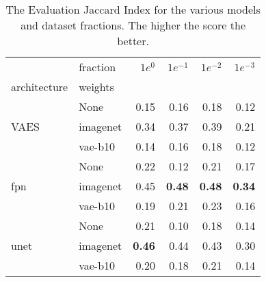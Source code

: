 \begin{table}[ht]
\centering
\caption{The Evaluation Jaccard Index for the various models and dataset fractions. The higher the score the better.}
\label{tab:data_fraction_results}
\begin{tabular}{llrrrr}
\toprule
 & fraction & $1e^{0}$ & $1e^{-1}$ & $1e^{-2}$ & $1e^{-3}$ \\
architecture & weights &  &  &  &  \\
\midrule
\multirow[t]{3}{*}{VAES} & None & 0.15 & 0.16 & 0.18 & 0.12 \\
 & imagenet & 0.34 & 0.37 & 0.39 & 0.21 \\
 & vae-b10 & 0.14 & 0.16 & 0.18 & 0.12 \\
\cline{1-6}
\multirow[t]{3}{*}{fpn} & None & 0.22 & 0.12 & 0.21 & 0.17 \\
 & imagenet & 0.45 & \textbf{0.48} & \textbf{0.48} & \textbf{0.34} \\
 & vae-b10 & 0.19 & 0.21 & 0.23 & 0.16 \\
\cline{1-6}
\multirow[t]{3}{*}{unet} & None & 0.21 & 0.10 & 0.18 & 0.14 \\
 & imagenet & \textbf{0.46} & 0.44 & 0.43 & 0.30 \\
 & vae-b10 & 0.20 & 0.18 & 0.21 & 0.14 \\
\cline{1-6}
\bottomrule
\end{tabular}
\end{table}

